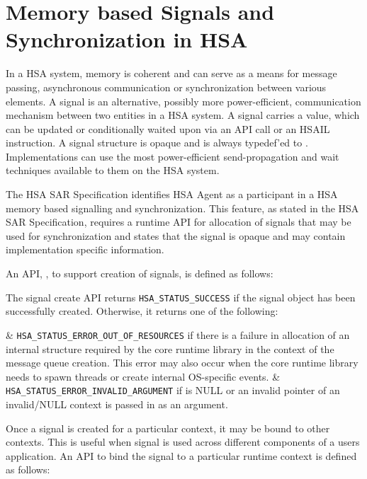 \hypertarget{signals}{}\section{Memory based Signals and
Synchronization in H\-S\-A}\label{signals}

In a HSA system, memory is coherent and can serve as a means for
message passing, asynchronous communication or synchronization
between various elements.  A signal is an alternative, possibly more
power-efficient, communication mechanism between two entities in a
H\-S\-A system. A signal carries a value, which can be updated or
conditionally waited upon via an API call or an HSAIL
instruction. A signal structure is opaque and is
always typedef'ed to . 
Implementations can use the most power-efficient send-propagation
and wait techniques available to them on the HSA system.  

The HSA SAR Specification identifies HSA Agent as a
participant in a HSA memory based signalling and synchronization.
This feature, as stated in the HSA SAR Specification, requires a
runtime API for allocation of signals that may be used for
synchronization and states that the signal is opaque and may contain
implementation specific information.  

An API, , to support
creation of signals, is defined as follows:



The signal create API returns \texttt{HSA\_STATUS\_SUCCESS} if the
signal object has been successfully created. Otherwise, it returns
one of the following:

\begin{easylist}
& \texttt{HSA\_STATUS\_ERROR\_OUT\_OF\_RESOURCES} if there is a failure
in allocation of an internal structure required by the core runtime
library in the context of the message queue creation. This error may
also occur when the core runtime library needs to spawn threads or
create internal OS-specific events. 
& \texttt{HSA\_STATUS\_ERROR\_INVALID\_ARGUMENT} if {\itshape
{}} is NULL or an invalid pointer of an invalid/NULL
context is passed in as an argument.
\end{easylist}

Once a signal is created for a particular context, it may be bound
to other contexts. This is useful when signal is used across
different components of a users application. An API to bind the
signal to a particular runtime context is defined as follows:

